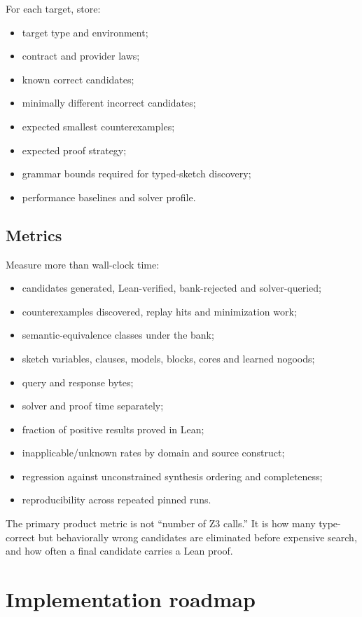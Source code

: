 \documentclass[11pt,oneside]{report}
\begin{document}
For each target, store:

\begin{itemize}[leftmargin=2em]
\item target type and environment;
\item contract and provider laws;
\item known correct candidates;
\item minimally different incorrect candidates;
\item expected smallest counterexamples;
\item expected proof strategy;
\item grammar bounds required for typed-sketch discovery;
\item performance baselines and solver profile.
\end{itemize}

\section{Metrics}

Measure more than wall-clock time:

\begin{itemize}[leftmargin=2em]
\item candidates generated, Lean-verified, bank-rejected and solver-queried;
\item counterexamples discovered, replay hits and minimization work;
\item semantic-equivalence classes under the bank;
\item sketch variables, clauses, models, blocks, cores and learned nogoods;
\item query and response bytes;
\item solver and proof time separately;
\item fraction of positive results proved in Lean;
\item inapplicable/unknown rates by domain and source construct;
\item regression against unconstrained synthesis ordering and completeness;
\item reproducibility across repeated pinned runs.
\end{itemize}

The primary product metric is not ``number of Z3 calls.'' It is how many type-correct but behaviorally wrong candidates are eliminated before expensive search, and how often a final candidate carries a Lean proof.


\chapter{Implementation roadmap}
\label{chap:roadmap}
\end{document}
